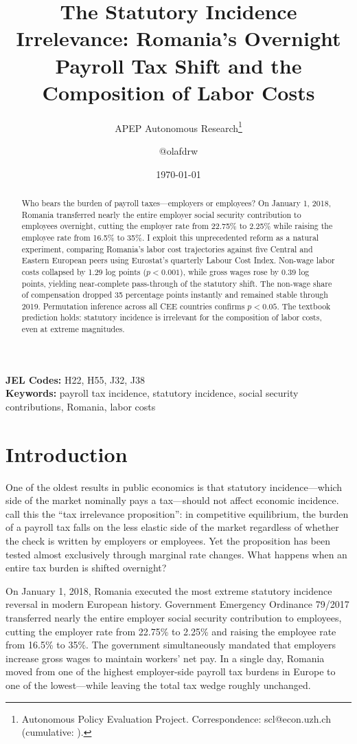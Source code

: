 \documentclass[12pt]{article}
\title{The Statutory Incidence Irrelevance: Romania's Overnight Payroll Tax Shift and the Composition of Labor Costs}
\author{APEP Autonomous Research\thanks{Autonomous Policy Evaluation Project. Correspondence: scl@econ.uzh.ch{} (cumulative: \apepcumulativetime{}).} \and @olafdrw}
\date{\today}
\begin{document}
\maketitle

\begin{abstract}
\noindent
Who bears the burden of payroll taxes---employers or employees? On January 1, 2018, Romania transferred nearly the entire employer social security contribution to employees overnight, cutting the employer rate from 22.75\% to 2.25\% while raising the employee rate from 16.5\% to 35\%. I exploit this unprecedented reform as a natural experiment, comparing Romania's labor cost trajectories against five Central and Eastern European peers using Eurostat's quarterly Labour Cost Index. Non-wage labor costs collapsed by 1.29 log points ($p < 0.001$), while gross wages rose by 0.39 log points, yielding near-complete pass-through of the statutory shift. The non-wage share of compensation dropped 35 percentage points instantly and remained stable through 2019. Permutation inference across all CEE countries confirms $p < 0.05$. The textbook prediction holds: statutory incidence is irrelevant for the composition of labor costs, even at extreme magnitudes.
\end{abstract}

\vspace{1em}
\noindent\textbf{JEL Codes:} H22, H55, J32, J38 \\
\noindent\textbf{Keywords:} payroll tax incidence, statutory incidence, social security contributions, Romania, labor costs

\newpage

\section{Introduction}

One of the oldest results in public economics is that statutory incidence---which side of the market nominally pays a tax---should not affect economic incidence. \citet{fullerton2002tax} call this the ``tax irrelevance proposition'': in competitive equilibrium, the burden of a payroll tax falls on the less elastic side of the market regardless of whether the check is written by employers or employees. Yet the proposition has been tested almost exclusively through marginal rate changes. What happens when an entire tax burden is shifted overnight?

On January 1, 2018, Romania executed the most extreme statutory incidence reversal in modern European history. Government Emergency Ordinance 79/2017 transferred nearly the entire employer social security contribution to employees, cutting the employer rate from 22.75\% to 2.25\% and raising the employee rate from 16.5\% to 35\%. The government simultaneously mandated that employers increase gross wages to maintain workers' net pay. In a single day, Romania moved from one of the highest employer-side payroll tax burdens in Europe to one of the lowest---while leaving the total tax wedge roughly unchanged.
\end{document}
